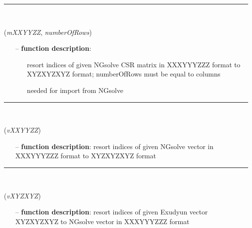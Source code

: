 \begin{itemize}[leftmargin=1.4cm]
\begin{itemize}[leftmargin=0.5cm]
\begin{itemize}[leftmargin=1.4cm]
\begin{itemize}[leftmargin=1.4cm]
\begin{itemize}[leftmargin=0.5cm]
%
\noindent\rule{8cm}{0.75pt}\vspace{1pt} \\ 
\begin{flushleft}
\label{sec:FEM:ResortIndicesOfCSRmatrix}
({\it mXXYYZZ}, {\it numberOfRows})
\end{flushleft}
\setlength{\itemindent}{0.7cm}
\begin{itemize}[leftmargin=0.7cm]
  \item[--]  {\bf function description}: \vspace{-6pt}
  \begin{itemize}[leftmargin=1.2cm]
\setlength{\itemindent}{-0.7cm}
    \item[] resort indices of given NGsolve CSR matrix in XXXYYYZZZ format to XYZXYZXYZ format; numberOfRows must be equal to columns
    \item[] needed for import from NGsolve
  \end{itemize}
\vspace{12pt}\end{itemize}
%
\noindent\rule{8cm}{0.75pt}\vspace{1pt} \\ 
\begin{flushleft}
\label{sec:FEM:ResortIndicesOfNGvector}
({\it vXXYYZZ})
\end{flushleft}
\setlength{\itemindent}{0.7cm}
\begin{itemize}[leftmargin=0.7cm]
  \item[--]  {\bf function description}: resort indices of given NGsolve vector in XXXYYYZZZ format to XYZXYZXYZ format\vspace{12pt}\end{itemize}
%
\noindent\rule{8cm}{0.75pt}\vspace{1pt} \\ 
\begin{flushleft}
\label{sec:FEM:ResortIndicesExudyn2NGvector}
({\it vXYZXYZ})
\end{flushleft}
\setlength{\itemindent}{0.7cm}
\begin{itemize}[leftmargin=0.7cm]
  \item[--]  {\bf function description}: resort indices of given Exudyun vector XYZXYZXYZ to NGsolve vector in XXXYYYZZZ format\vspace{12pt}\end{itemize}

\end{itemize}
\end{itemize}
\end{itemize}
\end{itemize}
\end{itemize}
